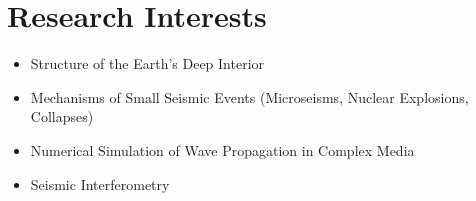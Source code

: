\section*{Research Interests}

\begin{itemize}
\item Structure of the Earth's Deep Interior
\item Mechanisms of Small Seismic Events (Microseisms, Nuclear Explosions, Collapses)
\item Numerical Simulation of Wave Propagation in Complex Media
\item Seismic Interferometry
\end{itemize}
